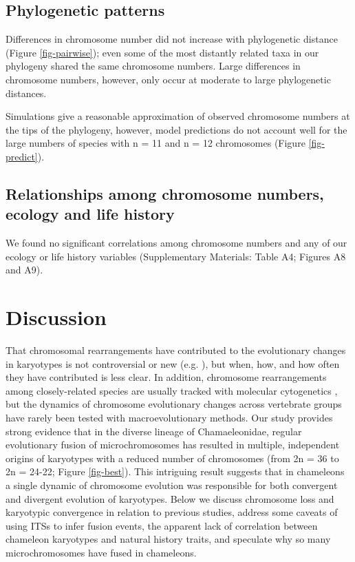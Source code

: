 \documentclass[a4paper, 12pt]{article}
\begin{document}
\subsection{Phylogenetic patterns}
Differences in chromosome number did not increase with phylogenetic distance (Figure \ref{fig-pairwise}); even some of the most distantly related taxa in our phylogeny shared the same chromosome numbers. 
Large differences in chromosome numbers, however, only occur at moderate to large phylogenetic distances. 

Simulations give a reasonable approximation of observed chromosome numbers at the tips of the phylogeny, however, model predictions do not account well for the large numbers of species with n = 11 and n = 12 chromosomes (Figure \ref{fig-predict}).

\subsection{Relationships among chromosome numbers, ecology and life history}
We found no significant correlations among chromosome numbers and any of our ecology or life history variables (Supplementary Materials: Table A4; Figures A8 and A9). 

\section{Discussion}

That chromosomal rearrangements have contributed to the evolutionary changes in karyotypes is not controversial or new (e.g. \citealt{deakin2016anchoring}), but when, how, and how often they have contributed is less clear. 
In addition, chromosome rearrangements among closely-related species are usually tracked with molecular cytogenetics \citep{lisachov2021whole}, but the dynamics of chromosome evolutionary changes across vertebrate groups have rarely been tested with macroevolutionary methods. 
Our study provides strong evidence that in the diverse lineage of Chamaeleonidae, regular evolutionary fusion of microchromosomes has resulted in multiple, independent origins of karyotypes with a reduced number of chromosomes (from 2n = 36 to 2n = 24-22; Figure \ref{fig-best}). 
This intriguing result suggests that in chameleons a single dynamic of chromosome evolution was responsible for both convergent and divergent evolution of karyotypes. 
Below we discuss chromosome loss and karyotypic convergence in relation to previous studies, address some caveats of using ITSs to infer fusion events, the apparent lack of correlation between chameleon karyotypes and natural history traits, and speculate why so many microchromosomes have fused in chameleons.    
\end{document}
